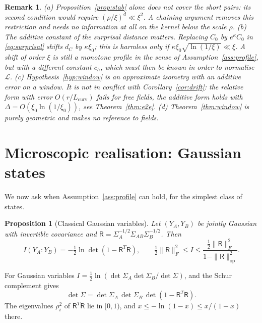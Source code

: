 \documentclass[11pt,a4paper]{article}
\makeatletter
\theoremstyle{stmt}
\newtheorem{proposition}[theorem]{Proposition}
\theoremstyle{defn}
\theoremstyle{rmk}
\newtheorem{remark}[theorem]{Remark}
\renewenvironment{proof}[1][\proofname]{\par\pushQED{\qed}\normalfont\topsep6\p@\@plus6\p@\relax
  \trivlist\item[\hskip\labelsep{\sffamily\itshape\small #1.}]\ignorespaces}{\popQED\endtrivlist\@endpefalse}
\numberwithin{equation}{section}
\newcommand{\Lc}{\mathcal{L}}
\newcommand{\Lcurv}{L_{\mathrm{curv}}}
\makeatother
\begin{document}
\begin{remark}\label{rem:window}
(a) Proposition~\ref{prop:stab} alone does not cover the short pairs: its second condition would require $(\rho/\xi)^d\ll\xi^2$. A chaining argument removes this restriction and needs no information at all on the kernel below the scale $\rho$.
(b) The additive constant of the surprisal distance matters. Replacing $C_0$ by $e^{\kappa}C_0$ in \eqref{eq:surprisal} shifts $d_C$ by $\kappa\xi_0$; this is harmless only if $\kappa\xi_0\sqrt{\ln(1/\xi)}\ll\xi$. A shift of order $\xi$ is still a monotone profile in the sense of Assumption~\ref{ass:profile}, but with a different constant $c_h$, which must then be known in order to normalise $\Lc$.
(c) Hypothesis~\ref{hyp:window} is an approximate isometry with an additive error on a window. It is not in conflict with Corollary~\ref{cor:drift}: the relative form with error $O(r/\Lcurv)$ fails for free fields, the additive form holds with $\Delta=O(\xi_0\ln(1/\xi_0))$, see Theorem~\ref{thm:e2e}.
(d) Theorem~\ref{thm:window} is purely geometric and makes no reference to fields.
\end{remark}

\section{Microscopic realisation: Gaussian states}\label{sec:gauss}

We now ask when Assumption~\ref{ass:profile} can hold, for the simplest class of states.

\begin{proposition}[Classical Gaussian variables]\label{prop:classical}
Let $(Y_A,Y_B)$ be jointly Gaussian with invertible covariance and $\mathsf R=\Sigma_A^{-1/2}\Sigma_{AB}\Sigma_B^{-1/2}$. Then
\begin{equation}
I(Y_A:Y_B)=-\tfrac12\ln\det(1-\mathsf R^{T}\mathsf R),\qquad \tfrac12\|\mathsf R\|_F^2\le I\le\frac{\tfrac12\|\mathsf R\|_F^2}{1-\|\mathsf R\|_{\mathrm{op}}^2}.
\end{equation}
\end{proposition}

\begin{proof}
For Gaussian variables $I=\tfrac12\ln(\det\Sigma_A\det\Sigma_B/\det\Sigma)$, and the Schur complement gives
\[\det\Sigma=\det\Sigma_A\,\det\Sigma_B\,\det(1-\mathsf R^T\mathsf R).\] The eigenvalues $\rho_i^2$ of $\mathsf R^T\mathsf R$ lie in $[0,1)$, and $x\le-\ln(1-x)\le x/(1-x)$ there.
\end{proof}
\end{document}
